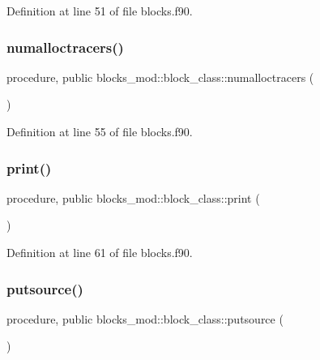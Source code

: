 Definition at line 51 of file blocks.\+f90.

\mbox{\label{structblocks__mod_1_1block__class_a7a3f2eb6823a683a6aaa2159b50ee990}} 
\subsubsection{\texorpdfstring{numalloctracers()}{numalloctracers()}}
{\footnotesize\ttfamily procedure, public blocks\+\_\+mod\+::block\+\_\+class\+::numalloctracers (\begin{DoxyParamCaption}{ }\end{DoxyParamCaption})}



Definition at line 55 of file blocks.\+f90.

\mbox{\label{structblocks__mod_1_1block__class_a43b4c133934eaadb55d30cf834d1e28c}} 
\subsubsection{\texorpdfstring{print()}{print()}}
{\footnotesize\ttfamily procedure, public blocks\+\_\+mod\+::block\+\_\+class\+::print (\begin{DoxyParamCaption}{ }\end{DoxyParamCaption})}



Definition at line 61 of file blocks.\+f90.

\mbox{\label{structblocks__mod_1_1block__class_ac79980e841902691a06212dce50f6331}} 
\subsubsection{\texorpdfstring{putsource()}{putsource()}}
{\footnotesize\ttfamily procedure, public blocks\+\_\+mod\+::block\+\_\+class\+::putsource (\begin{DoxyParamCaption}{ }\end{DoxyParamCaption})}



